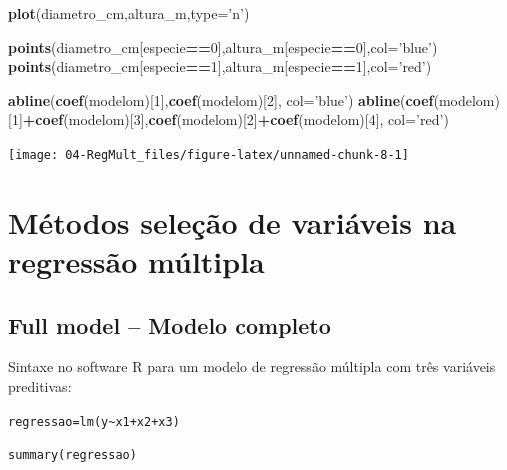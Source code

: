 \documentclass[12pt,brazil,oneside]{book}
\newenvironment{Shaded}{\begin{snugshade}}{\end{snugshade}}
\newcommand{\DataTypeTok}[1]{\textcolor[rgb]{0.13,0.29,0.53}{#1}}
\newcommand{\DecValTok}[1]{\textcolor[rgb]{0.00,0.00,0.81}{#1}}
\newcommand{\KeywordTok}[1]{\textcolor[rgb]{0.13,0.29,0.53}{\textbf{#1}}}
\newcommand{\NormalTok}[1]{#1}
\newcommand{\OperatorTok}[1]{\textcolor[rgb]{0.81,0.36,0.00}{\textbf{#1}}}
\newcommand{\StringTok}[1]{\textcolor[rgb]{0.31,0.60,0.02}{#1}}
\begin{document}
\begin{Shaded}
\begin{Highlighting}[]
\KeywordTok{plot}\NormalTok{(diametro_cm,altura_m,}\DataTypeTok{type=}\StringTok{'n'}\NormalTok{)}

\KeywordTok{points}\NormalTok{(diametro_cm[especie}\OperatorTok{==}\DecValTok{0}\NormalTok{],altura_m[especie}\OperatorTok{==}\DecValTok{0}\NormalTok{],}\DataTypeTok{col=}\StringTok{'blue'}\NormalTok{)}
\KeywordTok{points}\NormalTok{(diametro_cm[especie}\OperatorTok{==}\DecValTok{1}\NormalTok{],altura_m[especie}\OperatorTok{==}\DecValTok{1}\NormalTok{],}\DataTypeTok{col=}\StringTok{'red'}\NormalTok{)}

\KeywordTok{abline}\NormalTok{(}\KeywordTok{coef}\NormalTok{(modelom)[}\DecValTok{1}\NormalTok{],}\KeywordTok{coef}\NormalTok{(modelom)[}\DecValTok{2}\NormalTok{], }\DataTypeTok{col=}\StringTok{'blue'}\NormalTok{)}
\KeywordTok{abline}\NormalTok{(}\KeywordTok{coef}\NormalTok{(modelom)[}\DecValTok{1}\NormalTok{]}\OperatorTok{+}\KeywordTok{coef}\NormalTok{(modelom)[}\DecValTok{3}\NormalTok{],}\KeywordTok{coef}\NormalTok{(modelom)[}\DecValTok{2}\NormalTok{]}\OperatorTok{+}\KeywordTok{coef}\NormalTok{(modelom)[}\DecValTok{4}\NormalTok{], }\DataTypeTok{col=}\StringTok{'red'}\NormalTok{)}
\end{Highlighting}
\end{Shaded}

\begin{center}\texttt{[image: 04-RegMult\_files/figure-latex/unnamed-chunk-8-1]} \end{center}

\hypertarget{metodos-selecao-de-variaveis-na-regressao-multipla}{%
\section{Métodos seleção de variáveis na regressão
múltipla}\label{metodos-selecao-de-variaveis-na-regressao-multipla}}

\hypertarget{full-model-modelo-completo}{%
\subsection{Full model -- Modelo
completo}\label{full-model-modelo-completo}}

Sintaxe no software R para um modelo de regressão múltipla com três
variáveis preditivas:

\texttt{regressao=lm(y\textasciitilde{}x1+x2+x3)}

\texttt{summary(regressao)}
\end{document}
